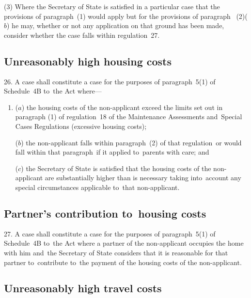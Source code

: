 \documentclass[12pt,a4paper]{article}
\begin{document}
(3) Where the Secretary of State is satisfied in a particular case that the provisions of paragraph~(1) would apply but for the provisions of paragraph~%
(2)($b$)  %
he may, whether or not any application on that ground has been made, consider whether the case falls within regulation~27.


\subsection[26. Unreasonably high housing costs]{Unreasonably high housing costs}

26. A case shall constitute a case for the
purposes of paragraph~5(1) of Schedule~4B to~the Act where—
\begin{enumerate}\item[]
($a$) the housing costs of the non-applicant exceed the limits set out in paragraph
(1) of regulation~18 of the Maintenance Assessments and~Special Cases
Regulations (excessive housing costs);

($b$) the non-applicant falls within paragraph~(2) of that regulation~or would fall
within that paragraph~if it applied to~parents with care; and

($c$) the Secretary of State is satisfied that the housing costs of the
non-applicant are substantially higher than is necessary taking into~account any
special circumstances applicable to~that non-applicant.
\end{enumerate}

\subsection[27. Partner’s contribution to~housing costs]{Partner’s contribution to~housing costs}

27. A case shall constitute a case for
the purposes of paragraph~5(1) of Schedule~4B to~the Act where a partner of the
non-applicant occupies the home with him and~the Secretary of State considers
that it is reasonable for that partner to~contribute to~the payment of the
housing costs of the non-applicant.

\subsection[28. Unreasonably high travel costs]{Unreasonably high travel costs}
\end{document}

